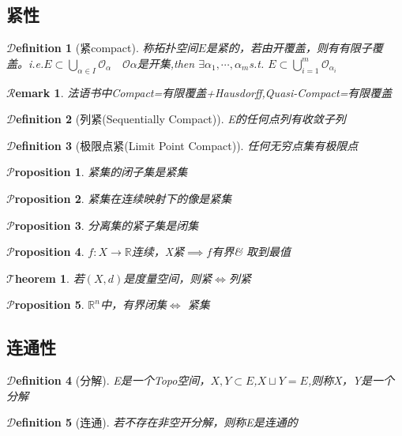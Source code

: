 \documentclass[hyperfer,UTF8,a4paper,12pt]{article}
\theoremstyle{plain}
\newtheorem{Thm}{$\mathcal{T}$heorem}
\newtheorem*{Prop}{$\mathcal{P}$roposition}
\newtheorem*{Remark}{$\mathcal{R}$emark}
\newtheorem{Def}{{$\mathcal{D}$efinition}}[section]
\begin{document}
\subsection{紧性}
\begin{Def}[紧compact]
	称拓扑空间$ E $是紧的，若由开覆盖，则有有限子覆盖。i.e.$ E\subset\bigcup\limits_{\alpha\in I}\mathcal{O}_\alpha\quad \mathcal{O}\alpha$是开集,then $ \exists \alpha_1,\cdots,\alpha_m $s.t. $ E\subset\bigcup\limits_{i=1}^m \mathcal{O}_{\alpha_i} $
\end{Def}
\begin{Remark}
	法语书中Compact=有限覆盖+Hausdorff,Quasi-Compact=有限覆盖
\end{Remark}

\begin{Def}[列紧(Sequentially Compact)]
	E的任何点列有收敛子列
\end{Def}

\begin{Def}[极限点紧(Limit Point Compact)]
	任何无穷点集有极限点
\end{Def}

\begin{Prop}
	紧集的闭子集是紧集
\end{Prop}
\begin{Prop}
	紧集在连续映射下的像是紧集
\end{Prop}
\begin{Prop}
	分离集的紧子集是闭集
\end{Prop}

\begin{Prop}
	$ f:X\to\mathbb{R} $连续，X紧$ \implies $$ f $有界\& 取到最值
\end{Prop}

\begin{Thm}
	若$ (X,d) $是度量空间，则紧$ \Leftrightarrow $列紧
\end{Thm}

\begin{Prop}
	$ \mathbb{R}^n $中，有界闭集$ \Leftrightarrow $ 紧集
\end{Prop}

\subsection{连通性}
\begin{Def}[分解]
	E是一个Topo空间，$ X,Y\subset E $,$ X\sqcup Y=E $,则称X，Y是一个分解
\end{Def}

\begin{Def}[连通]
	若不存在非空开分解，则称E是连通的
\end{Def}
\end{document}
